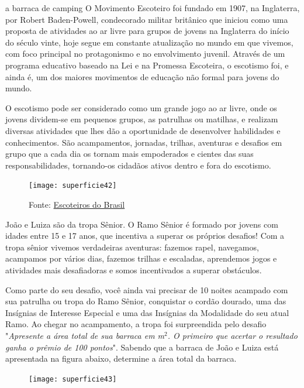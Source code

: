 \begin{task}{a barraca de camping}
O Movimento Escoteiro foi fundado em 1907, na Inglaterra, por Robert Baden-Powell, condecorado militar britânico que iniciou como uma proposta de atividades ao ar livre para grupos de jovens na Inglaterra do início do século vinte, hoje segue em constante atualização no mundo em que vivemos, com foco principal no protagonismo e no envolvimento juvenil. Através de um programa educativo baseado na Lei e na Promessa Escoteira, o escotismo foi, e ainda é, um dos maiores movimentos de educação não formal para jovens do mundo. 

O escotismo pode ser considerado como um grande jogo ao ar livre, onde os jovens dividem-se em pequenos grupos, as patrulhas ou matilhas, e realizam diversas atividades que lhes dão a oportunidade de desenvolver habilidades e conhecimentos. São acampamentos, jornadas, trilhas, aventuras e desafios em grupo que a cada dia os tornam mais empoderados e cientes das suas responsabilidades, tornando-os cidadãos ativos dentro e fora do escotismo.

\begin{figure}[H]
\centering

\texttt{[image: superficie42]}

\caption{Fonte: \href{https://www.escoteiros.org.br/wp-content/uploads/2020/07/1.1.1-Foto-Gráfico-1-800x515.png}{Escoteiros do Brasil}}
\end{figure}

João e Luiza são da tropa Sênior. O Ramo Sênior é formado por jovens com idades entre 15 e 17 anos, que incentiva a superar os próprios desafios! Com a tropa sênior vivemos verdadeiras aventuras: fazemos rapel, navegamos, acampamos por vários dias, fazemos trilhas e escaladas, aprendemos jogos e atividades mais desafiadoras e somos incentivados a superar obstáculos.

Como parte do seu desafio, você ainda vai precisar de 10 noites acampado com sua patrulha ou tropa do Ramo Sênior, conquistar o cordão dourado, uma das Insígnias de Interesse Especial e uma das Insígnias da Modalidade do seu atual Ramo. Ao chegar no acampamento, a tropa foi surpreendida pelo desafio "\textit{Apresente a área total de sua barraca em m$^2$. O primeiro que acertar o resultado ganha o prêmio de 100 pontos}". Sabendo que a barraca de João e Luiza está apresentada na figura abaixo, determine a área total da barraca.
\begin{figure}[H]
\centering

\texttt{[image: superficie43]}
\end{figure}
\end{task}

